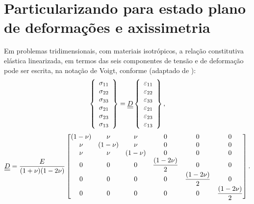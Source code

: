 \section{Particularizando para estado plano de deformações e axissimetria}
Em problemas tridimensionais, com materiais isotrópicos, a relação constitutiva elástica linearizada, em termos das seis componentes de tensão e de deformação pode ser escrita, na notação de Voigt, conforme (adaptado de ):
\begin{equation}
	\label{eq:Dl}
	\left\{\begin{array}{lcl}
		\sigma_{11} \\
		\sigma_{22} \\
		\sigma_{33} \\
		\sigma_{21} \\
		\sigma_{23} \\
		\sigma_{13} 
	\end{array}\right\} = 
	\underline{\underline D}
	\left\{\begin{array}{lcl}
	\varepsilon_{11} \\
	\varepsilon_{22} \\
	\varepsilon_{33} \\
	\varepsilon_{21} \\
	\varepsilon_{23} \\
	\varepsilon_{13} 
\end{array}\right\},
\end{equation}
\begin{equation}
	\underline{\underline D} = 
	\dfrac{E}{(1+\nu)(1-2\nu)} 
	\begin{bmatrix}
	(1-\nu)	& \nu 		& \nu  		& 0	 		& 0 			& 0 \\
	\nu 	& (1-\nu)	& \nu  		& 0		 	& 0				& 0  \\
	\nu 	& \nu 		& (1-\nu)   & 0		 	& 0 			& 0  \\
	0		& 0			& 0		    & \dfrac{(1-2\nu)}{2} & 0 			& 0  \\
	0		& 0			& 0		    & 0	       	& \dfrac{(1-2\nu)}{2}	& 0  \\
	0		& 0			& 0		    & 0	       	& 0         	& \dfrac{(1-2\nu)}{2}
	\end{bmatrix}.
\end{equation}

